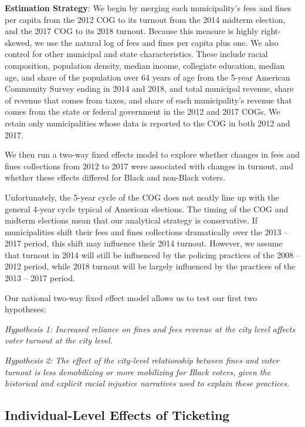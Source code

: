 \documentclass[
  12pt,
]{article}
\begin{document}
\textbf{Estimation Strategy}: We begin by merging each municipality's fees and fines per capita from the 2012 COG to its turnout from the 2014 midterm election, and the 2017 COG to its 2018 turnout. Because this measure is highly right-skewed, we use the natural log of fees and fines per capita plus one. We also control for other municipal and state characteristics. These include racial composition, population density, median income, collegiate education, median age, and share of the population over 64 years of age from the 5-year American Community Survey ending in 2014 and 2018, and total municipal revenue, share of revenue that comes from taxes, and share of each municipality's revenue that comes from the state or federal government in the 2012 and 2017 COGs. We retain only municipalities whose data is reported to the COG in both 2012 and 2017.

We then run a two-way fixed effects model to explore whether changes in fees and fines collections from 2012 to 2017 were associated with changes in turnout, and whether these effects differed for Black and non-Black voters.

Unfortunately, the 5-year cycle of the COG does not neatly line up with the general 4-year cycle typical of American elections. The timing of the COG and midterm elections mean that our analytical strategy is conservative. If municipalities shift their fees and fines collections dramatically over the 2013 -- 2017 period, this shift may influence their 2014 turnout. However, we assume that turnout in 2014 will still be influenced by the policing practices of the 2008 -- 2012 period, while 2018 turnout will be largely influenced by the practices of the 2013 -- 2017 period.

Our national two-way fixed effect model allows us to test our first two hypotheses:

\emph{Hypothesis 1: Increased reliance on fines and fees revenue at the city level affects voter turnout at the city level.}

\emph{Hypothesis 2: The effect of the city-level relationship between fines and voter turnout is less demobilizing or more mobilizing for Black voters, given the historical and explicit racial injustice narratives used to explain these practices.}

\hypertarget{individual-level-effects-of-ticketing}{%
\subsection*{Individual-Level Effects of Ticketing}\label{individual-level-effects-of-ticketing}}
\end{document}
